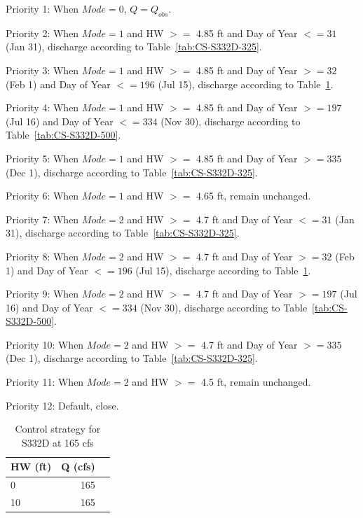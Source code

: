 \begin{packed_items}
\item Priority 1: When $Mode=0$, $Q=Q_{obs}$.
\item[]
\item Priority 2: When $Mode=1$ and HW $>=$ 4.85 ft and Day of Year $<=31$ (Jan 31), discharge according to Table~\ref{tab:CS-S332D-325}.
\item Priority 3: When $Mode=1$ and HW $>=$ 4.85 ft and Day of Year $>=32$ (Feb 1) and Day of Year $<=196$ (Jul 15), discharge according to Table~\ref{tab:CS-S332D-165}.
\item Priority 4: When $Mode=1$ and HW $>=$ 4.85 ft and Day of Year $>=197$ (Jul 16) and Day of Year $<=334$ (Nov 30), discharge according to Table~\ref{tab:CS-S332D-500}.
\item Priority 5: When $Mode=1$ and HW $>=$ 4.85 ft and Day of Year $>=335$ (Dec 1), discharge according to Table~\ref{tab:CS-S332D-325}.
\item Priority 6: When $Mode=1$ and HW $>=$ 4.65 ft, remain unchanged.
\item[]
\item Priority 7: When $Mode=2$ and HW $>=$ 4.7 ft and Day of Year $<=31$ (Jan 31), discharge according to Table~\ref{tab:CS-S332D-325}.
\item Priority 8: When $Mode=2$ and HW $>=$ 4.7 ft and Day of Year $>=32$ (Feb 1) and Day of Year $<=196$ (Jul 15), discharge according to Table~\ref{tab:CS-S332D-165}.
\item Priority 9: When $Mode=2$ and HW $>=$ 4.7 ft and Day of Year $>=197$ (Jul 16) and Day of Year $<=334$ (Nov 30), discharge according to Table~\ref{tab:CS-S332D-500}.
\item Priority 10: When $Mode=2$ and HW $>=$ 4.7 ft and Day of Year $>=335$ (Dec 1), discharge according to Table~\ref{tab:CS-S332D-325}.
\item Priority 11: When $Mode=2$ and HW $>=$ 4.5 ft, remain unchanged.
\item[]
\item Priority 12: Default, close.
\end{packed_items}


\footnotesize
\begin{table}[!h]
\centering
\caption{Control strategy for S332D at 165 cfs}
\label{tab:CS-S332D-165}
\begin{tabular}{l|rr}
\hline
\textbf{HW (ft)} &  \textbf{Q (cfs)} \\
\hline
0        &    165  \\
10       &    165  \\
\hline
\end{tabular}
\end{table}
\normalsize


